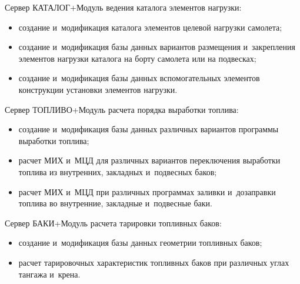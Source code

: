 \begin{multicols}{2}
\begin{description}
\pagebreak

 \item[\,]
Сервер КАТАЛОГ\;+\;Модуль ведения каталога элементов нагрузки:\\[-9pt]
\begin{itemize}
\item создание и~модификация каталога элементов целевой нагрузки самолета;\\[-9pt]
\item создание и~модификация базы данных вариантов размещения 
и~закрепления элементов нагрузки каталога на борту самолета или на подвесках;\\[-9pt]
\item создание и~модификация базы данных вспомогательных элементов 
конструкции установки элементов нагрузки.\\[-9pt]
\end{itemize}
 \item[\,]
Сервер ТОПЛИВО\;+\;Модуль расчета порядка выработки топлива:\\[-9pt]
\begin{itemize}
\item создание и~модификация базы данных различных вариантов программы 
выработки топлива;\\[-9pt]
\item расчет МИХ и~МЦД для различных вариантов переключения выработки 
топлива из внутренних, закладных и~подвесных баков;\\[-9pt]
\item расчет МИХ и~МЦД при различных программах заливки и~дозаправки 
топлива во внутренние, закладные и~подвесные баки.\\[-9pt]
\end{itemize}
 \item[\,]
Сервер БАКИ\;+\;Модуль расчета тарировки топливных баков:\\[-9pt]
\begin{itemize}
\item создание и~модификация базы данных гео\-мет\-рии топливных баков;\\[-9pt]
\item расчет тарировочных характеристик топливных баков при различных 
углах тангажа и~крена.\\[-9pt]
  \end{itemize}
  \end{description}
  

\end{multicols}
